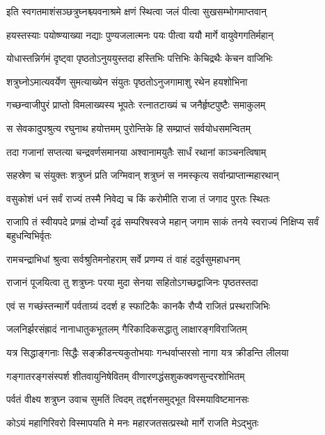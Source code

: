 \twolineshloka
{इति स्वगतमाशंसञ्छत्रुघ्नश्च्यवनाश्रमे}
{क्षणं स्थित्वा जलं पीत्वा सुखसम्भोगमाप्तवान्}%

\twolineshloka
{हयस्तस्याः पयोष्ण्याख्या नद्याः पुण्यजलात्मनः}
{पयः पीत्वा ययौ मार्गे वायुवेगगतिर्महान्}%

\twolineshloka
{योधास्तन्निर्गमं दृष्ट्वा पृष्ठतोऽनुययुस्तदा}
{हस्तिभिः पत्तिभिः केचिद्रथैः केचन वाजिभिः}%

\twolineshloka
{शत्रुघ्नोऽमात्यवर्येण सुमत्याख्येन संयुतः}
{पृष्ठतोऽनुजगामाशु रथेन हयशोभिना}%

\twolineshloka
{गच्छन्वाजीपुरं प्राप्तो विमलाख्यस्य भूपतेः}
{रत्नातटाख्यं च जनैर्हृष्टपुष्टैः समाकुलम्}%

\twolineshloka
{स सेवकादुपश्रुत्य रघुनाथ हयोत्तमम्}
{पुरोन्तिके हि सम्प्राप्तं सर्वयोधसमन्वितम्}%

\twolineshloka
{तदा गजानां सप्तत्या चन्द्रवर्णसमानया}
{अश्वानामयुतैः सार्धं रथानां काञ्चनत्विषाम्}%

\twolineshloka
{सहस्रेण च संयुक्तः शत्रुघ्नं प्रति जग्मिवान्}
{शत्रुघ्नं स नमस्कृत्य सर्वान्प्राप्तान्महारथान्}%

\twolineshloka
{वसुकोशं धनं सर्वं राज्यं तस्मै निवेद्य च}
{किं करोमीति राजा तं जगाद पुरतः स्थितः}%

\fourlineindentedshloka
{राजापि तं स्वीयपदे प्रणम्रं}
{दोर्भ्यां दृढं सम्परिषस्वजे महान्}
{जगाम साकं तनये स्वराज्यं}
{निक्षिप्य सर्वं बहुधन्विभिर्वृतः}%

\twolineshloka
{रामचन्द्राभिधां श्रुत्वा सर्वश्रुतिमनोहराम्}
{सर्वे प्रणम्य तं वाहं ददुर्वसुमहाधनम्}%

\twolineshloka
{राजानं पूजयित्वा तु शत्रुघ्नः परया मुदा}
{सेनया सहितोऽगच्छद्वाजिनः पृष्ठतस्तदा}%

\twolineshloka
{एवं स गच्छंस्तन्मार्गे पर्वताग्र्यं ददर्श ह}
{स्फाटिकैः कानकै रौप्यै राजितं प्रस्थराजिभिः}%

\twolineshloka
{जलनिर्झरसंह्रादं नानाधातुकभूतलम्}
{गैरिकादिकसद्धातु लाक्षारङ्गविराजितम्}%

\twolineshloka
{यत्र सिद्धाङ्गनाः सिद्धैः सङ्क्रीडन्त्यकुतोभयाः}
{गन्धर्वाप्सरसो नागा यत्र क्रीडन्ति लीलया}%

\twolineshloka
{गङ्गातरङ्गसंस्पर्श शीतवायुनिषेवितम्}
{वीणारणद्धंसशुकक्वणसुन्दरशोभितम्}%

\twolineshloka
{पर्वतं वीक्ष्य शत्रुघ्न उवाच सुमतिं त्विदम्}
{तद्दर्शनसमुद्भूत विस्मयाविष्टमानसः}%

\twolineshloka
{कोऽयं महागिरिवरो विस्मापयति मे मनः}
{महारजतसत्प्रस्थो मार्गे राजति मेऽद्भुतः}%


